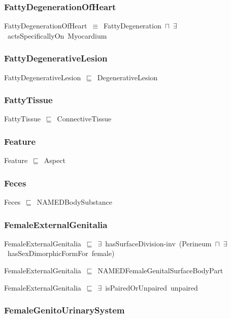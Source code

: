 \documentclass{article}
\begin{document}
\subsubsection*{FattyDegenerationOfHeart}

FattyDegenerationOfHeart~\ensuremath{\equiv}~FattyDegeneration~\ensuremath{\sqcap}~\ensuremath{\exists}~actsSpecificallyOn~Myocardium

\subsubsection*{FattyDegenerativeLesion}

FattyDegenerativeLesion~\ensuremath{\sqsubseteq}~DegenerativeLesion~

\subsubsection*{FattyTissue}

FattyTissue~\ensuremath{\sqsubseteq}~ConnectiveTissue~

\subsubsection*{Feature}

Feature~\ensuremath{\sqsubseteq}~Aspect~

\subsubsection*{Feces}

Feces~\ensuremath{\sqsubseteq}~NAMEDBodySubstance~

\subsubsection*{FemaleExternalGenitalia}

FemaleExternalGenitalia~\ensuremath{\sqsubseteq}~\ensuremath{\exists}~hasSurfaceDivision-inv~(Perineum~\ensuremath{\sqcap}~\ensuremath{\exists}~hasSexDimorphicFormFor~female)~

FemaleExternalGenitalia~\ensuremath{\sqsubseteq}~NAMEDFemaleGenitalSurfaceBodyPart~

FemaleExternalGenitalia~\ensuremath{\sqsubseteq}~\ensuremath{\exists}~isPairedOrUnpaired~unpaired~

\subsubsection*{FemaleGenitoUrinarySystem}
\end{document}
